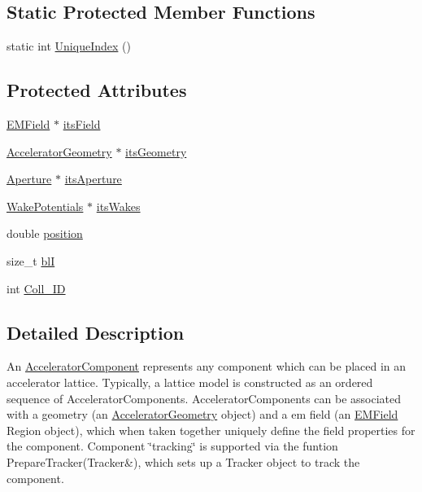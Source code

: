 \subsection*{Static Protected Member Functions}
\begin{DoxyCompactItemize}
\item 
static int \hyperlink{classAcceleratorComponent_aa7ad4d39e1a488b705983842ed1ac784}{Unique\+Index} ()
\end{DoxyCompactItemize}
\subsection*{Protected Attributes}
\begin{DoxyCompactItemize}
\item 
\hyperlink{classEMField}{E\+M\+Field} $\ast$ \hyperlink{classAcceleratorComponent_a52505c3dfbebf65c38e4de96d72c7718}{its\+Field}
\item 
\hyperlink{classAcceleratorGeometry}{Accelerator\+Geometry} $\ast$ \hyperlink{classAcceleratorComponent_acb1728d9dcd2234fef5b9a6d529db347}{its\+Geometry}
\item 
\hyperlink{classAperture}{Aperture} $\ast$ \hyperlink{classAcceleratorComponent_a776332766062c4e9342ef06d8ba0b45f}{its\+Aperture}
\item 
\hyperlink{classWakePotentials}{Wake\+Potentials} $\ast$ \hyperlink{classAcceleratorComponent_ad1c133d85754bbdc05d72471d9b34ee6}{its\+Wakes}
\item 
double \hyperlink{classAcceleratorComponent_a379d5d0bc151e90328e834f520707c7e}{position}
\item 
size\+\_\+t \hyperlink{classAcceleratorComponent_a73212fc2b6e9f0f71eca5cd633bd5d2f}{blI}
\item 
int \hyperlink{classAcceleratorComponent_a19b829780a5667b311e760329088b9db}{Coll\+\_\+\+ID}
\end{DoxyCompactItemize}


\subsection{Detailed Description}
An \hyperlink{classAcceleratorComponent}{Accelerator\+Component} represents any component which can be placed in an accelerator lattice. Typically, a lattice model is constructed as an ordered sequence of Accelerator\+Components. Accelerator\+Components can be associated with a geometry (an \hyperlink{classAcceleratorGeometry}{Accelerator\+Geometry} object) and a em field (an \hyperlink{classEMField}{E\+M\+Field} Region object), which when taken together uniquely define the field properties for the component. Component \char`\"{}tracking\char`\"{} is supported via the funtion Prepare\+Tracker(\+Tracker\&), which sets up a Tracker object to track the component. 

